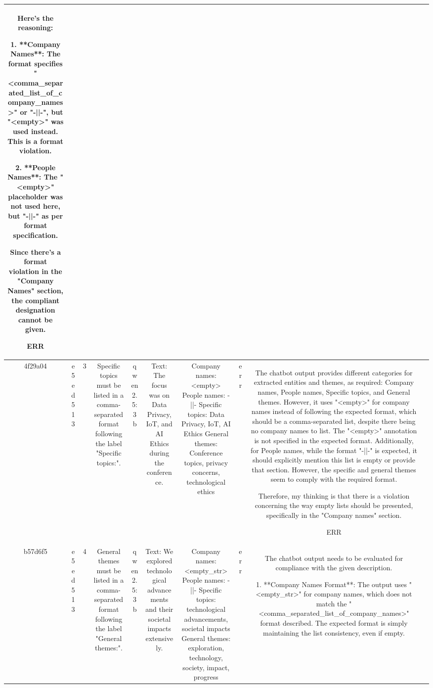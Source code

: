 \begin{table}[h!]
\begin{tabular}{|c|c|c|c|c|c|c|c|c|c|}
Here's the reasoning:

1. **Company Names**: The format specifies "<comma_separated_list_of_company_names>" or "-||-", but "<empty>" was used instead. This is a format violation.
   
2. **People Names**: The "<empty>" placeholder was not used here, but "-||-" as per format specification.

Since there's a format violation in the "Company Names" section, the compliant designation cannot be given.

ERR & \\
\hline
4f29a04 & e5ed513 & 3 & Specific topics must be listed in a comma-separated format following the label "Specific topics:". & qwen2.5:3b & Text: The focus was on Data Privacy, IoT, and AI Ethics during the conference. & Company names: <empty>
People names: -||-
Specific topics: Data Privacy, IoT, AI Ethics
General themes: Conference topics, privacy concerns, technological ethics & err & The chatbot output provides different categories for extracted entities and themes, as required: Company names, People names, Specific topics, and General themes. However, it uses "<empty>" for company names instead of following the expected format, which should be a comma-separated list, despite there being no company names to list. The "<empty>" annotation is not specified in the expected format. Additionally, for People names, while the format "-||-" is expected, it should explicitly mention this list is empty or provide that section. However, the specific and general themes seem to comply with the required format.

Therefore, my thinking is that there is a violation concerning the way empty lists should be presented, specifically in the "Company names" section.

ERR & \\
\hline
b57d6f5 & e5ed513 & 4 & General themes must be listed in a comma-separated format following the label "General themes:". & qwen2.5:3b & Text: We explored technological advancements and their societal impacts extensively. & Company names: <empty_str>
People names: -||-
Specific topics: technological advancements, societal impacts
General themes: exploration, technology, society, impact, progress & err & The chatbot output needs to be evaluated for compliance with the given description.

1. **Company Names Format**: The output uses "<empty_str>" for company names, which does not match the "<comma_separated_list_of_company_names>" format described. The expected format is simply maintaining the list consistency, even if empty.


\end{tabular}
\end{table}
